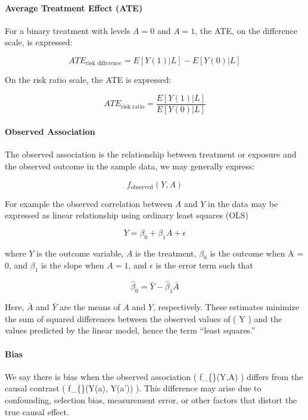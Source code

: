 \documentclass[
  singlecolumn]{article}
\let\oldparagraph\paragraph
\renewcommand{\paragraph}[1]{\oldparagraph{#1}\mbox{}}
\begin{document}
\hypertarget{average-treatment-effect-ate}{%
\paragraph{\texorpdfstring{\textbf{Average Treatment Effect
(ATE)}}{Average Treatment Effect (ATE)}}\label{average-treatment-effect-ate}}

For a binary treatment with levels \(A=0\) and \(A=1\), the ATE, on the
difference scale, is expressed:

\[ATE_{\text{risk difference}} = E[Y(1)|L] - E[Y(0)|L]\]

On the risk ratio scale, the ATE is expressed:

\[ATE_{\text{risk ratio}} = \frac{E[Y(1)|L]}{E[Y(0)|L]}\]

\hypertarget{observed-association}{%
\paragraph{\texorpdfstring{\textbf{Observed
Association}}{Observed Association}}\label{observed-association}}

The observed association is the relationship between treatment or
exposure and the observed outcome in the sample data, we may generally
express:

\[f_{\text{observed}}(Y, A)\]

For example the observed correlation between \(A\) and \(Y\) in the data
may be expressed as linear relationship using ordinary least squares
(OLS)

\[Y = \beta_0 + \beta_1 A + \epsilon\]

where \(Y\) is the outcome variable, \(A\) is the treatment, \(\beta_0\)
is the outcome when A = 0, and \(\beta_1\) is the slope when \(A = 1\),
and \(\epsilon\) is the error term such that

\[\hat{\beta}_0 = \bar{Y} - \hat{\beta}_1 \bar{A}\]

Here, \(\bar{A}\) and \(\bar{Y}\) are the means of \(A\) and \(Y\),
respectively. These estimates minimize the sum of squared differences
between the observed values of ( Y ) and the values predicted by the
linear model, hence the term ``least squares.''

\hypertarget{bias}{%
\paragraph{\texorpdfstring{\textbf{Bias}}{Bias}}\label{bias}}

We say there is bias when the observed association (
f\_\{\}(Y,A) ) differs from the causal contrast (
f\_\{\}(Y(a), Y(a')) ). This difference may arise due to
confounding, selection bias, measurement error, or other factors that
distort the true causal effect.
\end{document}
